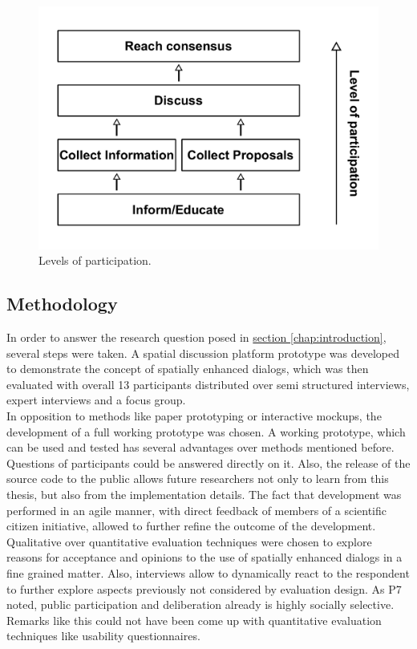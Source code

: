 \begin{figure}[!h]
    \centering
    \includegraphics[width=1\columnwidth]{images/my_ladder}
    \caption{Levels of participation. }
    \label{fig:data_structure}
\end{figure}

\subsection{Methodology}
\label{sub:method-discussion}
In order to answer the research question posed in \hyperref[chap:introduction]{section \ref{chap:introduction}}, several steps were taken. A spatial discussion platform prototype was developed to demonstrate the concept of spatially enhanced dialogs, which was then evaluated with overall 13 participants distributed over semi structured interviews, expert interviews and a focus group.\\
In opposition to methods like paper prototyping or interactive mockups, the development of a full working prototype was chosen. A working prototype, which can be used and tested has several advantages over methods mentioned before. Questions of participants could be answered directly on it. Also, the release of the source code to the public allows future researchers not only to learn from this thesis, but also from the implementation details. The fact that development was performed in an agile manner, with direct feedback of members of a scientific citizen initiative, allowed to further refine the outcome of the development.\\
Qualitative over quantitative evaluation techniques were chosen to explore reasons for acceptance and opinions to the use of spatially enhanced dialogs in a fine grained matter. Also, interviews allow to dynamically react to the respondent to further explore aspects previously not considered by evaluation design. As P7 noted, public participation and deliberation already is highly socially selective. Remarks like this could not have been come up with quantitative evaluation techniques like usability questionnaires.\\

